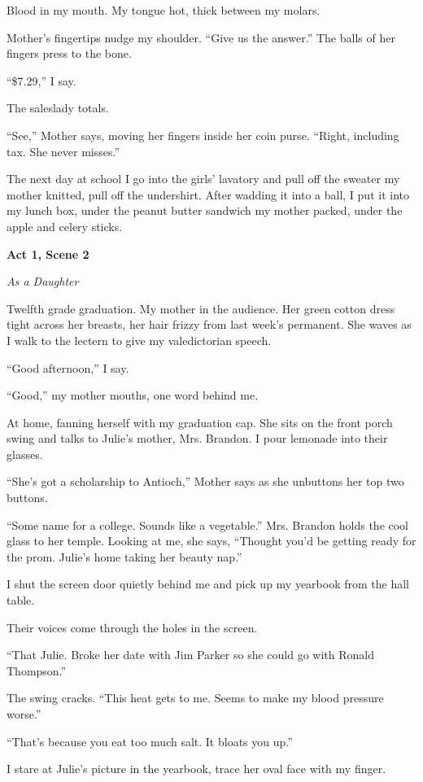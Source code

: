 \documentclass[twoside,10pt]{book}
\begin{document}
Blood in my mouth. My tongue hot, thick between my molars.

Mother's fingertips nudge my shoulder. ``Give us the answer.'' The balls
of her fingers press to the bone.

``\$7.29,'' I say.

The saleslady totals.

``See,'' Mother says, moving her fingers inside her coin purse. ``Right,
including tax. She never misses.''

The next day at school I go into the girls' lavatory and pull off the
sweater my mother knitted, pull off the undershirt. After wadding it
into a ball, I put it into my lunch box, under the peanut butter
sandwich my mother packed, under the apple and celery sticks.

\textbf{Act 1, Scene 2}

\emph{As a Daughter}

Twelfth grade graduation. My mother in the audience. Her green cotton
dress tight across her breasts, her hair frizzy from last week's
permanent. She waves as I walk to the lectern to give my valedictorian
speech.

``Good afternoon,'' I say.

``Good,'' my mother mouths, one word behind me.

At home, fanning herself with my graduation cap. She sits on the front
porch swing and talks to Julie's mother, Mrs. Brandon. I pour lemonade
into their glasses.

``She's got a scholarship to Antioch,'' Mother says as she unbuttons her
top two buttons.

``Some name for a college. Sounds like a vegetable.'' Mrs. Brandon holds
the cool glass to her temple. Looking at me, she says, ``Thought you'd
be getting ready for the prom. Julie's home taking her beauty nap.''

I shut the screen door quietly behind me and pick up my yearbook from
the hall table.

Their voices come through the holes in the screen.

``That Julie. Broke her date with Jim Parker so she could go with Ronald
Thompson.''

The swing cracks. ``This heat gets to me. Seems to make my blood
pressure worse.''

``That's because you eat too much salt. It bloats you up.''

I stare at Julie's picture in the yearbook, trace her oval face with my
finger.
\end{document}
